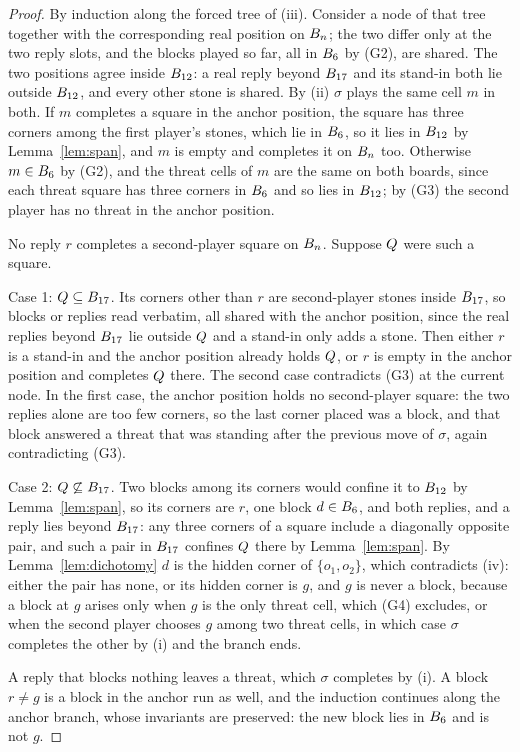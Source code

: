 \documentclass[11pt]{amsart}
\theoremstyle{definition}
\theoremstyle{remark}
\begin{document}
\begin{proof}
By induction along the forced tree of (iii). Consider a node of that
tree together with the corresponding real position on $B_n$; the
two differ only at the two reply slots, and the blocks played so far,
all in $B_6$ by (G2), are shared. The two positions agree inside
$B_{12}$: a real reply beyond $B_{17}$ and its stand-in both
lie outside $B_{12}$, and every other stone is shared. By (ii)
$\sigma$ plays the same cell $m$ in both. If $m$ completes a square in
the anchor position, the square has three corners among the first
player's stones, which lie in $B_6$, so it lies in $B_{12}$
by Lemma~\ref{lem:span}, and $m$ is empty and completes it on
$B_n$ too. Otherwise $m \in B_6$ by (G2), and the threat
cells of $m$ are the same on both boards, since each threat square has
three corners in $B_6$ and so lies in $B_{12}$; by (G3) the
second player has no threat in the anchor position.

No reply $r$ completes a second-player square on $B_n$. Suppose
$Q$ were such a square.

Case 1: $Q \subseteq B_{17}$. Its corners other than $r$ are
second-player stones inside $B_{17}$, so blocks or replies read
verbatim, all shared with the anchor position, since the real replies
beyond $B_{17}$ lie outside $Q$ and a stand-in only adds a
stone. Then either $r$ is a stand-in and the anchor position already
holds $Q$, or $r$ is empty in the anchor position and completes
$Q$ there. The second case contradicts (G3) at the current node. In
the first case, the anchor position holds no second-player square: the
two replies alone are too few corners, so the last corner placed was a
block, and that block answered a threat that was standing after the
previous move of $\sigma$, again contradicting (G3).

Case 2: $Q \not\subseteq B_{17}$. Two blocks among its corners
would confine it to $B_{12}$ by Lemma~\ref{lem:span}, so
its corners are $r$, one block $d \in B_6$, and both replies, and
a reply lies beyond $B_{17}$: any three corners of a square
include a diagonally opposite pair, and such a pair in $B_{17}$
confines $Q$ there by Lemma~\ref{lem:span}. By
Lemma~\ref{lem:dichotomy} $d$ is the
hidden corner of $\{o_1, o_2\}$, which contradicts (iv): either the
pair has none, or its hidden corner is $g$, and $g$ is never a block,
because a block at $g$ arises only when $g$ is the only threat cell,
which (G4) excludes, or when the second player chooses $g$ among two
threat cells, in which case $\sigma$ completes the other by (i) and
the branch ends.

A reply that blocks nothing leaves a threat, which $\sigma$ completes
by (i). A block $r \ne g$ is a block in the anchor run as well, and the
induction continues along the anchor branch, whose invariants are
preserved: the new block lies in $B_6$ and is not $g$.
\end{proof}
\end{document}
